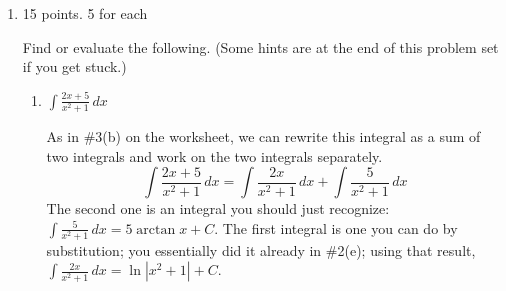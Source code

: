\documentclass{article}
\begin{document}
\begin{enumerate}
\begin{enumerate}[topsep=0pt]
    \item
      \begin{problem}[\vfill\newpage]
        $\displaystyle \int_0^1 t^2 \sin (\pi t^3)\,dt$
      \end{problem}

      \begin{solution}
        A good substitution to try is , since that's the
        inner function in the composition $\sin \left( \pi t^3 \right)$, and
        we also see something related to $du = 3 \pi t^2\,dt$ in the
        integral, namely .  As $t$ goes
        from $0$ to $1$, $u = \pi t^3$ goes from $\pi \cdot 0^3 = 0$ to $\pi
        \cdot 1^3 = \pi$.
        \begin{align*}
          \int_0^1 \subd{t^2} \sin \left(\sub{\pi t^3} \right)\,\subd{dt} &=
          \int_0^\pi \sin \sub{u} \left( \subd{\frac{du}{3 \pi}} \right) \\
          &= \frac{1}{3 \pi} \int_0^\pi \sin u\,du \\
          &= \left. - \frac{1}{3 \pi} \cos u \right|_0^\pi \\
          &= - \frac{1}{3 \pi} \left( -1 - 1 \right) \\
          &= \boxed{\frac{2}{3 \pi}}
        \end{align*}
      \end{solution}

    \end{enumerate}    
    \probonly{}

\item 

\begin{grading}
15 points. 5 for each
\end{grading}

Find or evaluate the following.
  (Some hints are at the end of this problem set if you get stuck.)

    \begin{enumerate}
      \item
\begin{problem}[\vfill]
        $\displaystyle \int \frac{2x + 5}{x^2 + 1}\,dx$
      \end{problem}

      \begin{solution} 
        As in {{{{\#3}}(b)}} on the worksheet, we can rewrite this
        integral as a sum of two integrals and work on the two integrals
        separately.
        \begin{equation} \label{eq:substitution-split-into-two-2}
\int
          \frac{2x+5}{x^2+1}\,dx = \int \frac{2x}{x^2+1}\,dx + \int
          \frac{5}{x^2+1}\,dx
        \end{equation}
        The second one is an integral you should just recognize:
        $\displaystyle \int \frac{5}{x^2+1}\,dx = 5 \arctan x + C$.
        The first integral is one you can do by substitution;
          you essentially did it already in {{{{\#2}}(e)}};
          using that result, $\displaystyle \int \frac{2x}{x^2 +1} \,dx =
          \ln \left| x^2 + 1 \right| + C$.


\end{solution}
\end{enumerate}
\end{enumerate}
\end{document}
